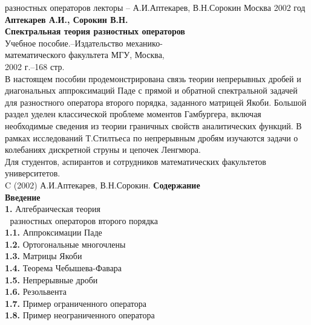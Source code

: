 \documentclass[12pt,a4paper]{article}
\theoremstyle{plain}   \newtheorem{Pro}{Задача}
\begin{document}
{ разностных операторов}
{лекторы --  А.И.Аптекарев, В.Н.Сорокин}
{}
{Москва 2002 год}
\newpage
$$ \; $$
{\bfseries Аптекарев А.И., Сорокин В.Н.}
$$ \; $$
$$ \; $$
{\bfseries Спектральная теория разностных операторов}
$$ \; $$
Учебное пособие.--Издательство механико- \\
математического факультета МГУ, Москва, \\
2002 г.--168 стр.
$$ \; $$
В настоящем пособии продемонстрирована связь теории непрерывных
дробей и диагональных аппроксимаций Паде с прямой и обратной
спектральной задачей для разностного оператора второго порядка,
заданного матрицей Якоби. Большой раздел уделен классической
проблеме моментов Гамбургера, включая необходимые сведения из
теории граничных свойств аналитических функций. В рамках
исследований Т.Стилтьеса по непрерывным дробям изучаются
задачи о колебаниях дискретной струны и цепочек Ленгмюра. \\
Для студентов, аспирантов и сотрудников математических
факультетов университетов.
\vspace{4 cm}\\
C (2002) А.И.Аптекарев, В.Н.Сорокин.
\newpage
{\Large \bfseries Содержание}
$$ \; $$
{\bfseries Введение}
$$ \; $$
{\Large \bfseries 1.}
Алгебраическая теория \\
$ \; $ разностных операторов второго порядка \\
{\bfseries 1.1.}
Аппроксимации Паде \\
{\bfseries 1.2.}
Ортогональные многочлены \\
{\bfseries 1.3.}
Матрицы Якоби \\
{\bfseries 1.4.}
Теорема Чебышева-Фавара \\
{\bfseries 1.5.}
Непрерывные дроби \\
{\bfseries 1.6.}
Резольвента \\
{\bfseries 1.7.}
Пример ограниченного оператора \\
{\bfseries 1.8.}
Пример неограниченного оператора \\
\end{document}
